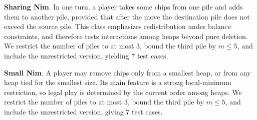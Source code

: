 \documentclass[review]{elsarticle}
\newcommand{\set}[1]{\{ #1 \}}
\newcommand{\tuple}[1]{\langle {#1} \rangle}
\newcommand{\true}{\top}
\newcommand{\statevar}{\mathcal{X}}
\newcommand{\act}{\mathcal{A}}
\newcommand{\constraint}{\mathcal{C}}
\newcommand{\estate}{\mathcal{E}}
\newcommand{\pre}{\mathtt{pre}}
\newcommand{\eff}{\mathtt{eff}}
\begin{document}
\textbf{Sharing Nim}. In one turn, a player takes some chips from one pile and adds them to another pile, provided that after the move the destination pile does not exceed the source pile.
This class emphasizes redistribution under balance constraints, and therefore tests interactions among heaps beyond pure deletion.
We restrict the number of piles to at most $3$, bound the third pile by $m \le 5$, and include the unrestricted version, yielding $7$ test cases.

\textbf{Small Nim}. A player may remove chips only from a smallest heap, or from any heap tied for the smallest size.
Its main feature is a strong local-minimum restriction, so legal play is determined by the current order among heaps.
We restrict the number of piles to at most $3$, bound the third pile by $m \le 5$, and include the unrestricted version, giving $7$ test cases.
\end{document}
